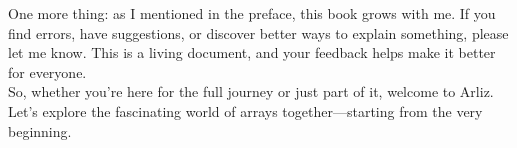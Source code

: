 One more thing: as I mentioned in the preface, this book grows with me. If you find errors, have suggestions, or discover better ways to explain something, please let me know. This is a living document, and your feedback helps make it better for everyone.\\
So, whether you're here for the full journey or just part of it, welcome to Arliz. Let's explore the fascinating world of arrays together—starting from the very beginning.\\